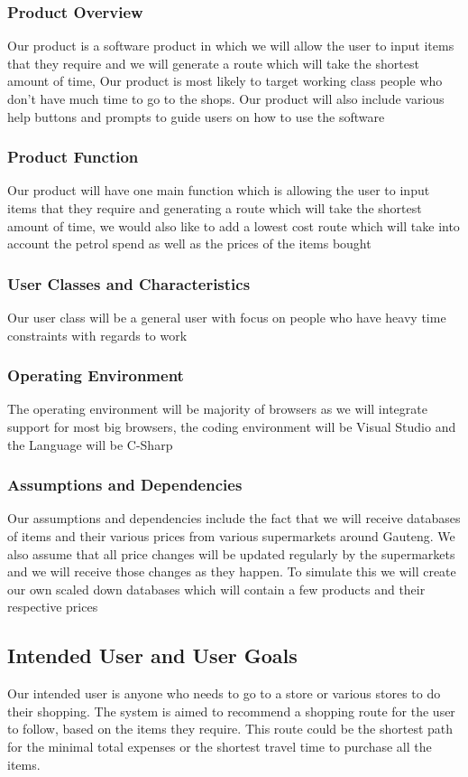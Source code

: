 \documentclass[12pt]{article}
\begin{document}
\subsubsection{Product Overview}
Our product is a software product in which we will allow the user to input 
items that they require and we will generate a route which will take the shortest amount
of time, Our product is most likely to target working class people who don't have much time 
to go to the shops. Our product will also include various help buttons and prompts to guide 
users on how to use the software 
\subsubsection{Product Function}
Our product will have one main function which is allowing the user to input 
items that they require and generating a route which will take the shortest amount
of time, we would also like to add a lowest cost route which will take into account 
the petrol spend as well as the prices of the items bought
\subsubsection{User Classes and Characteristics}
Our user class will be a general user with focus
on people who have heavy time constraints with regards to work
\subsubsection{Operating Environment}
The operating environment will be majority of browsers as we will 
integrate support for most big browsers, the coding environment will be Visual Studio and the
Language will be C-Sharp
\subsubsection{Assumptions and Dependencies}
Our assumptions and dependencies include the fact that we will
receive databases of items and their various prices from various supermarkets around Gauteng.
We also assume that all price changes will be updated regularly by the supermarkets and we will 
receive those changes as they happen. To simulate this we will create our own scaled down databases
which will contain a few products and their respective prices


\subsection{Intended User and User Goals}
Our intended user is anyone who needs to go to a store or various stores to do their shopping. The system is aimed to recommend a shopping route for the user to follow, based on the items they require. This route could be the shortest path for the minimal total expenses or the shortest travel time to purchase all the items.
\end{document}
